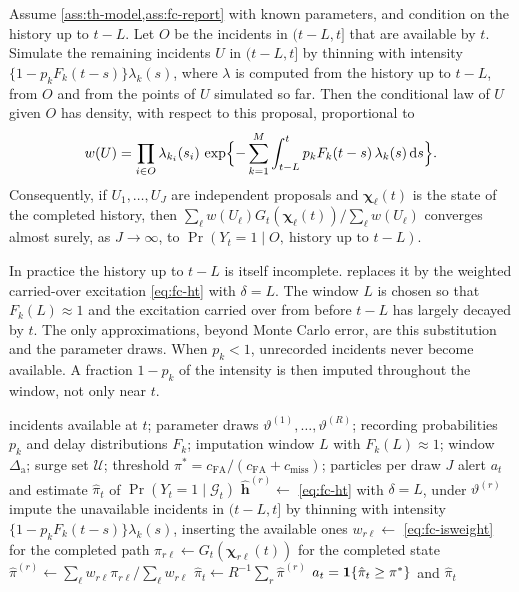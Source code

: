\begin{lemma}\label{lem:fc-is}
Assume \cref{ass:th-model,ass:fc-report} with known parameters, and condition on the
history up to $t-L$. Let $O$ be the incidents in $(t-L,t]$ that are available by $t$.
Simulate the remaining incidents $U$ in $(t-L,t]$ by thinning with intensity
$\{1-p_kF_k(t-s)\}\lambda_k(s)$, where $\lambda$ is computed from the history up to
$t-L$, from $O$ and from the points of $U$ simulated so far. Then the conditional law of
$U$ given $O$ has density, with respect to this proposal, proportional to
\begin{equation}\label{eq:fc-isweight}
  w(U)=\prod_{i\in O}\lambda_{k_i}(s_i)\,
  \exp\Bigl\{-\sum_{k=1}^{M}\int_{t-L}^{t}p_kF_k(t-s)\,\lambda_k(s)\,\mathrm{d} s\Bigr\}.
\end{equation}
Consequently, if $U_1,\dots,U_J$ are independent proposals and $\bm\chi_\ell(t)$ is the
state of the completed history, then $\sum_\ell w(U_\ell)G_t(\bm\chi_\ell(t))/\sum_\ell w(U_\ell)$
converges almost surely, as $J\to\infty$, to $\Pr(Y_t=1\mid O,\ \text{history up to }t-L)$.
\end{lemma}

In practice the history up to $t-L$ is itself incomplete.  replaces it
by the weighted carried-over excitation \eqref{eq:fc-ht} with $\delta=L$. The window $L$
is chosen so that $F_k(L)\approx1$ and the excitation carried over from before $t-L$ has
largely decayed by $t$. The only approximations, beyond Monte Carlo error, are this
substitution and the parameter draws. When $p_k<1$, unrecorded incidents never become
available. A fraction $1-p_k$ of the intensity is then imputed throughout the window,
not only near $t$.

\begin{algorithm}[t]
\caption{Real-time alerting with imputation of unreported incidents}\label{alg:alert}
\begin{algorithmic}[1]
\Require incidents available at $t$; parameter draws $\vartheta^{(1)},\dots,\vartheta^{(R)}$;
  recording probabilities $p_k$ and delay distributions $F_k$; imputation window $L$
  with $F_k(L)\approx1$; window $\Delta_{\mathrm a}$; surge set $\mathcal U$; threshold
  $\pi^*=c_{\mathrm{FA}}/(c_{\mathrm{FA}}+c_{\mathrm{miss}})$; particles per draw $J$
\Ensure alert $a_t$ and estimate $\hat\pi_t$ of $\Pr(Y_t=1\mid\mathcal G_t)$
  \State $\hat{\bm h}^{(r)}\gets$ \eqref{eq:fc-ht} with $\delta=L$, under $\vartheta^{(r)}$
    \State impute the unavailable incidents in $(t-L,t]$ by thinning with intensity
      $\{1-p_kF_k(t-s)\}\lambda_k(s)$, inserting the available ones
    \State $w_{r\ell}\gets$ \eqref{eq:fc-isweight} for the completed path
    \State $\pi_{r\ell}\gets G_t(\bm\chi_{r\ell}(t))$ for the completed state
  \EndFor
  \State $\hat\pi^{(r)}\gets\sum_\ell w_{r\ell}\pi_{r\ell}\big/\sum_\ell w_{r\ell}$
\EndFor
\State $\hat\pi_t\gets R^{-1}\sum_r\hat\pi^{(r)}$
\State \Return $a_t=\mathbf{1}\!\left\{\hat\pi_t\ge\pi^*\right\}$ and $\hat\pi_t$
\end{algorithmic}
\end{algorithm}

